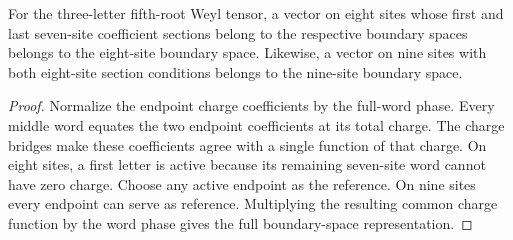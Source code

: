 \begin{lemma}
    \label{lem:short_weyl_eight_nine_intersections}
    \leanok
    For the three-letter fifth-root Weyl tensor, a vector on eight sites
    whose first and last seven-site coefficient sections belong to the
    respective boundary spaces belongs to the eight-site boundary space.
    Likewise, a vector on nine sites with both eight-site section conditions
    belongs to the nine-site boundary space.
\end{lemma}
\begin{proof}
    \leanok
    Normalize the endpoint charge coefficients by the full-word phase.
    Every middle word equates the two endpoint coefficients at
    its total charge. The charge bridges make these coefficients agree
    with a single function of that charge.
    On eight sites, a first letter is active because its remaining
    seven-site word cannot have zero charge. Choose any active endpoint
    as the reference. On nine sites every endpoint can serve as reference.
    Multiplying the resulting common charge function by the word phase
    gives the full boundary-space representation.
\end{proof}

